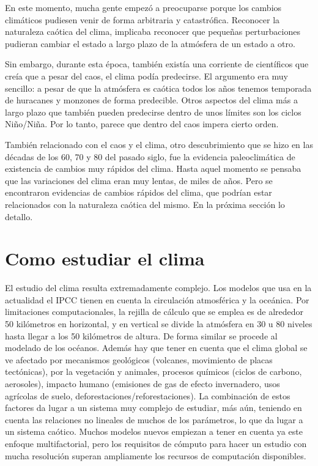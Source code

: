 \documentclass[
  10pt,
  a4paper,
  DIV=11,
  numbers=noendperiod,
  open=any]{scrreprt}
\numberwithin{equation}{chapter}
\numberwithin{equation}{section}
\renewcommand{\[}{\begin{equation}}
\renewcommand{\]}{\end{equation}}
\begin{document}
En este momento, mucha gente empezó a preocuparse porque los cambios
climáticos pudiesen venir de forma arbitraria y catastrófica. Reconocer
la naturaleza caótica del clima, implicaba reconocer que pequeñas
perturbaciones pudieran cambiar el estado a largo plazo de la atmósfera
de un estado a otro.

Sin embargo, durante esta época, también existía una corriente de
científicos que creía que a pesar del caos, el clima podía predecirse.
El argumento era muy sencillo: a pesar de que la atmósfera es caótica
todos los años tenemos temporada de huracanes y monzones de forma
predecible. Otros aspectos del clima más a largo plazo que también
pueden predecirse dentro de unos límites son los ciclos Niño/Niña. Por
lo tanto, parece que dentro del caos impera cierto orden.

También relacionado con el caos y el clima, otro descubrimiento que se
hizo en las décadas de los 60, 70 y 80 del pasado siglo, fue la
evidencia paleoclimática de existencia de cambios muy rápidos del clima.
Hasta aquel momento se pensaba que las variaciones del clima eran muy
lentas, de miles de años. Pero se encontraron evidencias de cambios
rápidos del clima, que podrían estar relacionados con la naturaleza
caótica del mismo. En la próxima sección lo detallo.

\section{Como estudiar el clima}\label{como-estudiar-el-clima}

El estudio del clima resulta extremadamente complejo. Los modelos que
usa en la actualidad el IPCC tienen en cuenta la circulación atmosférica
y la oceánica. Por limitaciones computacionales, la rejilla de cálculo
que se emplea es de alrededor 50 kilómetros en horizontal, y en vertical
se divide la atmósfera en 30 u 80 niveles hasta llegar a los 50
kilómetros de altura. De forma similar se procede al modelado de los
océanos. Además hay que tener en cuenta que el clima global se ve
afectado por mecanismos geológicos (volcanes, movimiento de placas
tectónicas), por la vegetación y animales, procesos químicos (ciclos de
carbono, aerosoles), impacto humano (emisiones de gas de efecto
invernadero, usos agrícolas de suelo, deforestaciones/reforestaciones).
La combinación de estos factores da lugar a un sistema muy complejo de
estudiar, más aún, teniendo en cuenta las relaciones no lineales de
muchos de los parámetros, lo que da lugar a un sistema caótico. Muchos
modelos nuevos empiezan a tener en cuenta ya este enfoque
multifactorial, pero los requisitos de cómputo para hacer un estudio con
mucha resolución superan ampliamente los recursos de computación
disponibles.
\end{document}
